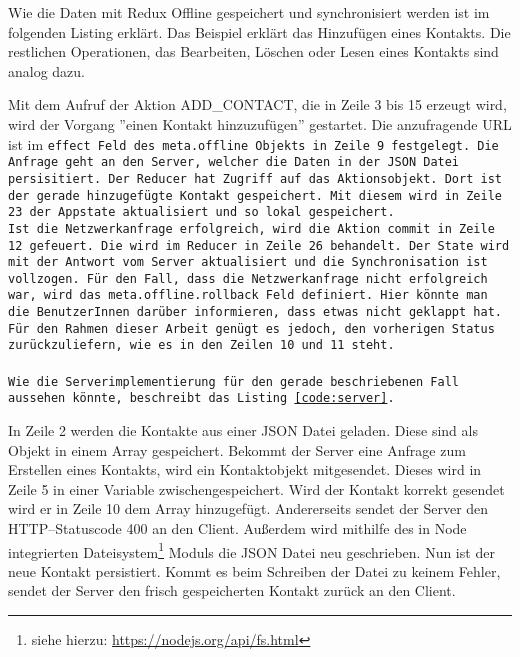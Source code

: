 Wie die Daten mit Redux Offline gespeichert und synchronisiert werden ist im folgenden Listing erklärt.
Das Beispiel erklärt das Hinzufügen eines Kontakts. Die restlichen Operationen, das Bearbeiten, Löschen oder Lesen eines Kontakts sind analog dazu.
%
\begin{center}  
\end{center}
%
Mit dem Aufruf der Aktion ADD\_CONTACT, die in Zeile 3 bis 15 erzeugt wird, wird der Vorgang ''einen Kontakt hinzuzufügen'' gestartet.
Die anzufragende URL ist im \tt{effect} Feld des \tt{meta.offline} Objekts in Zeile 9 festgelegt. Die Anfrage geht an den Server, welcher die Daten in der \gls{JSON} Datei persisitiert.
Der Reducer hat Zugriff auf das Aktionsobjekt. Dort ist der gerade hinzugefügte Kontakt gespeichert. Mit diesem wird in Zeile 23 der Appstate aktualisiert und so lokal gespeichert.\\
Ist die Netzwerkanfrage erfolgreich, wird die Aktion \tt{commit} in Zeile 12 gefeuert.
Die wird im Reducer in Zeile 26 behandelt. Der State wird mit der Antwort vom Server aktualisiert und die Synchronisation ist vollzogen.
Für den Fall, dass die Netzwerkanfrage nicht erfolgreich war, wird das \tt{meta.offline.rollback} Feld definiert.
Hier könnte man die BenutzerInnen darüber informieren, dass etwas nicht geklappt hat.
Für den Rahmen dieser Arbeit genügt es jedoch, den vorherigen Status zurückzuliefern, wie es in den Zeilen 10 und 11 steht.\\\\
Wie die Serverimplementierung für den gerade beschriebenen Fall aussehen könnte, beschreibt das Listing \ref{code:server}.
%
\begin{center}  
\end{center}
%
In Zeile 2 werden die Kontakte aus einer \gls{JSON} Datei geladen. Diese sind als Objekt in einem Array gespeichert.
Bekommt der Server eine Anfrage zum Erstellen eines Kontakts, wird ein Kontaktobjekt mitgesendet. Dieses wird in Zeile 5 in einer Variable zwischengespeichert. 
Wird der Kontakt korrekt gesendet wird er in Zeile 10 dem Array hinzugefügt.
Andererseits sendet der Server den \gls{HTTP}--Statuscode 400 an den Client. %
Außerdem wird mithilfe des in Node integrierten Dateisystem\footnote{siehe hierzu: \url{https://nodejs.org/api/fs.html}} Moduls die \gls{JSON} Datei neu geschrieben.
Nun ist der neue Kontakt persistiert. Kommt es beim Schreiben der Datei zu keinem Fehler, sendet der Server den frisch gespeicherten Kontakt zurück an den Client.